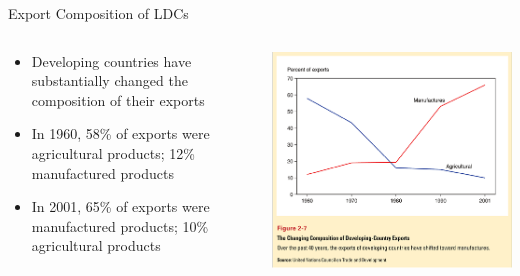 \documentclass[10pt,hyperref={CJKbookmarks=true},xcolor=dvipsnames,aspectratio=169]{beamer}
\begin{document}
\begin{frame}{Export Composition of LDCs}


\begin{columns}[onlytextwidth]
\begin{column}{0.55\textwidth}
\begin{itemize}
\item Developing countries have substantially changed the composition of
their exports 
\item In 1960, 58\% of exports were agricultural products; 12\% manufactured
products 
\item In 2001, 65\% of exports were manufactured products; 10\% agricultural
products 
\end{itemize}

\end{column}
\begin{column}{0.45\textwidth}
\includegraphics[width=\columnwidth]{fig/gravity/tra3}
\end{column}
\end{columns}

\end{frame}
\end{document}
